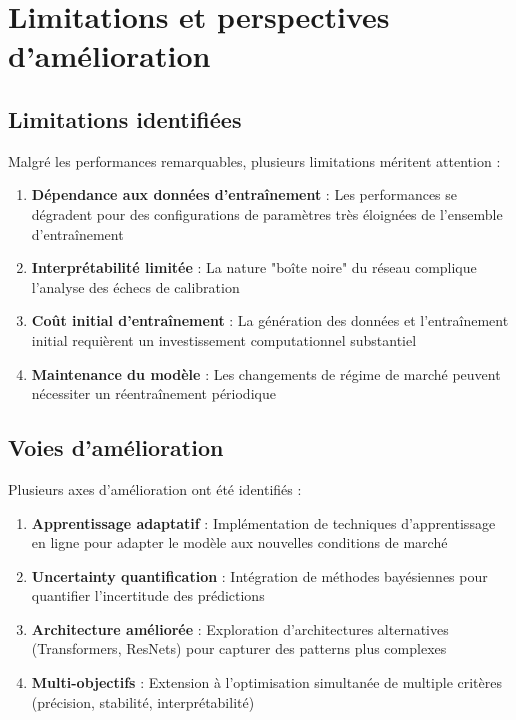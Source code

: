 \section{Limitations et perspectives d'amélioration}

\subsection{Limitations identifiées}

Malgré les performances remarquables, plusieurs limitations méritent attention :

\begin{enumerate}
\item \textbf{Dépendance aux données d'entraînement} : Les performances se dégradent pour des configurations de paramètres très éloignées de l'ensemble d'entraînement
\item \textbf{Interprétabilité limitée} : La nature "boîte noire" du réseau complique l'analyse des échecs de calibration
\item \textbf{Coût initial d'entraînement} : La génération des données et l'entraînement initial requièrent un investissement computationnel substantiel
\item \textbf{Maintenance du modèle} : Les changements de régime de marché peuvent nécessiter un réentraînement périodique
\end{enumerate}

\subsection{Voies d'amélioration}

Plusieurs axes d'amélioration ont été identifiés :

\begin{enumerate}
\item \textbf{Apprentissage adaptatif} : Implémentation de techniques d'apprentissage en ligne pour adapter le modèle aux nouvelles conditions de marché
\item \textbf{Uncertainty quantification} : Intégration de méthodes bayésiennes pour quantifier l'incertitude des prédictions
\item \textbf{Architecture améliorée} : Exploration d'architectures alternatives (Transformers, ResNets) pour capturer des patterns plus complexes
\item \textbf{Multi-objectifs} : Extension à l'optimisation simultanée de multiple critères (précision, stabilité, interprétabilité)
\end{enumerate}

